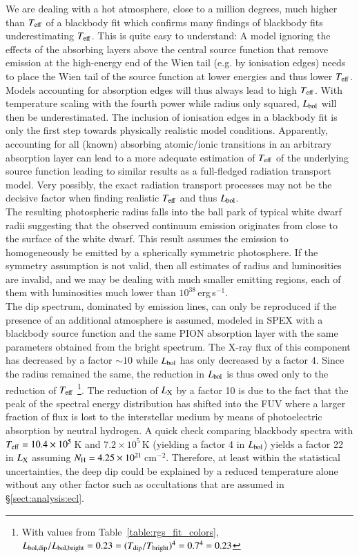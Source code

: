 \documentclass{aa}
\begin{document}
We are dealing with a hot atmosphere, close to a million degrees, much
higher than $T_{\rm eff}$ of a blackbody fit which confirms many findings
of blackbody fits underestimating $T_{\rm eff}$. This
is quite easy to understand: A model ignoring the effects of the absorbing
layers above the central source function that remove emission at the
high-energy end of the Wien tail (e.g. by ionisation edges) needs to place
the Wien tail of the source function at lower energies and
thus lower $T_{\rm eff}$. Models accounting for absorption edges will thus
always lead to high $T_{\rm eff}$. With temperature scaling with the
fourth power while radius only squared, $L_{\rm bol}$ will then be
underestimated. The inclusion of ionisation edges in a blackbody fit
is only the first step towards physically realistic model conditions.
Apparently, accounting for all (known) absorbing atomic/ionic transitions
in an arbitrary absorption layer can lead to a more adequate estimation of
$T_{\rm eff}$ of the underlying source function leading to
similar results as a full-fledged radiation transport model.
Very possibly, the exact radiation transport processes may not be the decisive
factor when finding realistic $T_{\rm eff}$ and thus $L_{\rm bol}$.\\

The resulting photospheric radius falls into the ball park of typical white
dwarf radii suggesting that the observed continuum emission originates
from close to the surface of the white dwarf. This result assumes the
emission to homogeneously be emitted by a spherically symmetric
photosphere. If the symmetry assumption is not valid, then all estimates
of radius and luminosities are invalid, and we may be dealing with much
smaller emitting regions, each of them with luminosities much lower than
$10^{38}$\,erg\,s$^{-1}$.\\

The dip spectrum, dominated by emission lines, can only be reproduced
if the presence of an additional atmosphere is assumed, modeled in SPEX with a
blackbody source function and the same {\scriptsize{PION}}
absorption layer with the same
parameters obtained from the bright spectrum. The X-ray flux of this component
has decreased by a factor $\sim 10$ while $L_{\rm bol}$ has only
decreased by a factor 4. Since the radius remained the same, the reduction
in $L_{\rm bol}$ is thus owed only to the reduction of $T_{\rm eff}$
\footnote{With values from Table~\ref{table:rgs_fit_colors},
$L_{\rm bol,dip}/L_{\rm bol, bright}=0.23=(T_{\rm dip}/T_{\rm bright})^4=0.7^4=0.23$}.
The reduction of $L_{\rm X}$ by
a factor 10 is due to the fact that the peak of the spectral energy
distribution has shifted into the FUV where a larger fraction of flux is
lost to the interstellar medium by means of photoelectric absorption by
neutral hydrogen. A quick check comparing blackbody spectra with
$T_{\rm eff}=10.4\times 10^5$\,K and $7.2\times 10^5$\,K (yielding a factor 4
in $L_{\rm bol}$) yields a factor 22 in $L_{\rm X}$ assuming
$N_{\rm H}=4.25\times 10^{21}$\,cm$^{-2}$. Therefore, at least within
the statistical uncertainties, the deep dip could
be explained by a reduced temperature alone without any other factor
such as occultations that are assumed in \S\ref{sect:analysis:ecl}.\\
\end{document}
